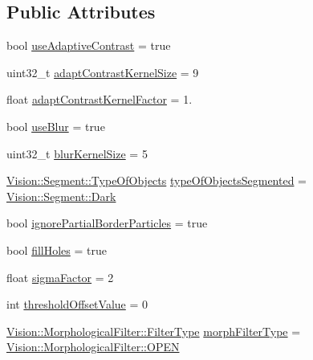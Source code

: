 \subsection*{Public Attributes}
\begin{DoxyCompactItemize}
\item 
bool \hyperlink{class_soil_analyzer_1_1_soil_settings_a0e27335d05aed8f3f084744062368578}{use\+Adaptive\+Contrast} = true
\item 
uint32\+\_\+t \hyperlink{class_soil_analyzer_1_1_soil_settings_a73f627b092dbdbda37b66ef6c2eef95c}{adapt\+Contrast\+Kernel\+Size} = 9
\item 
float \hyperlink{class_soil_analyzer_1_1_soil_settings_ace12c0f4bc35d420ef528cc390fc2cdb}{adapt\+Contrast\+Kernel\+Factor} = 1.
\item 
bool \hyperlink{class_soil_analyzer_1_1_soil_settings_a21bd246a48a712734af86f592030e18b}{use\+Blur} = true
\item 
uint32\+\_\+t \hyperlink{class_soil_analyzer_1_1_soil_settings_afa46542d30045e00fadbdd5a6ab9a1e1}{blur\+Kernel\+Size} = 5
\item 
\hyperlink{class_vision_1_1_segment_ac3ddf2c72ee6333007510b680db1e7dd}{Vision\+::\+Segment\+::\+Type\+Of\+Objects} \hyperlink{class_soil_analyzer_1_1_soil_settings_a21ae88dba6b9b0b07d9c26812bc739fb}{type\+Of\+Objects\+Segmented} = \hyperlink{class_vision_1_1_segment_ac3ddf2c72ee6333007510b680db1e7dda962a0c0955809f63df036dbd41824c54}{Vision\+::\+Segment\+::\+Dark}
\item 
bool \hyperlink{class_soil_analyzer_1_1_soil_settings_a24fb1d7da2247da77a17d853ea1494d7}{ignore\+Partial\+Border\+Particles} = true
\item 
bool \hyperlink{class_soil_analyzer_1_1_soil_settings_a2c9dbe9429742aed1da9d9683da5cc1e}{fill\+Holes} = true
\item 
float \hyperlink{class_soil_analyzer_1_1_soil_settings_a97e62512e12a2ba9210fd93950b6e717}{sigma\+Factor} = 2
\item 
int \hyperlink{class_soil_analyzer_1_1_soil_settings_a48330eb812672b50a94483f264614e8f}{threshold\+Offset\+Value} = 0
\item 
\hyperlink{class_vision_1_1_morphological_filter_a1f19c9cb13f0d68778c77d6fd0370868}{Vision\+::\+Morphological\+Filter\+::\+Filter\+Type} \hyperlink{class_soil_analyzer_1_1_soil_settings_ad1420c4800badb3eb07eba4767e3df81}{morph\+Filter\+Type} = \hyperlink{class_vision_1_1_morphological_filter_a1f19c9cb13f0d68778c77d6fd0370868afd436eed00afa15b23eeac4de3509303}{Vision\+::\+Morphological\+Filter\+::\+O\+P\+E\+N}

\end{DoxyCompactItemize}
